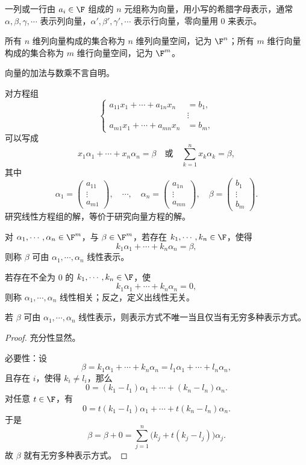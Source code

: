\begin{definition}
	一列或一行由 $a_i\in\F$ 组成的 $n$ 元组称为向量，用小写的希腊字母表示，通常 $\alpha,\beta,\gamma,\cdots$ 表示列向量，$\alpha',\beta',\gamma',\cdots$ 表示行向量，零向量用 $0$ 来表示。
	
	所有 $n$ 维列向量构成的集合称为 $n$ 维列向量空间，记为 $\F^n$；所有 $m$ 维行向量构成的集合称为 $m$ 维行向量空间，记为 $\F^m$。
	
	向量的加法与数乘不言自明。
	
	
\end{definition}
对方程组
\[
\left\{
\begin{aligned}
	a_{11}x_1+\cdots+a_{1n}x_n&=b_1,\\
	&\vdots\\
	a_{m1}x_1+\cdots+a_{mn}x_n&=b_m,
\end{aligned}
\right.
\]
可以写成
\[
x_1\alpha_1+\cdots+x_n\alpha_n=\beta
\quad\text{或}\quad
\sum_{k=1}^n x_k\alpha_k=\beta,
\]
其中
\[
\alpha_1=
\begin{pmatrix}
	a_{11}\\
	\vdots\\
	a_{m1}
\end{pmatrix},\quad
\cdots,\quad
\alpha_n=
\begin{pmatrix}
	a_{1n}\\
	\vdots\\
	a_{mn}
\end{pmatrix},\quad
\beta=
\begin{pmatrix}
	b_1\\
	\vdots\\
	b_m
\end{pmatrix}.
\]
研究线性方程组的解，等价于研究向量方程的解。
\begin{definition}
	对 $\alpha_1,\cdots,\alpha_n\in\F^m$，与 $\beta\in\F^m$，若存在 $k_1,\cdots,k_n\in\F$，使得
	\[
	k_1\alpha_1+\cdots+k_n\alpha_n=\beta,
	\]
	则称 $\beta$ 可由 $\alpha_1,\cdots,\alpha_n$ 线性表示。
	
	若存在不全为 $0$ 的 $k_1,\cdots,k_n\in\F$，使
	\[
	k_1\alpha_1+\cdots+k_n\alpha_n=0,
	\]
	则称 $\alpha_1,\cdots,\alpha_n$ 线性相关；反之，定义出线性无关。
\end{definition}

\begin{proposition}
	若 $\beta$ 可由 $\alpha_1,\cdots,\alpha_n$ 线性表示，则表示方式不唯一当且仅当有无穷多种表示方式。
\end{proposition}
\begin{proof}
	充分性显然。
	
	必要性：设
	\[
	\beta=k_1\alpha_1+\cdots+k_n\alpha_n
	=l_1\alpha_1+\cdots+l_n\alpha_n,
	\]
	且存在 $i$，使得 $k_i\neq l_i$，那么
	\[
	0=(k_1-l_1)\alpha_1+\cdots+(k_n-l_n)\alpha_n.
	\]
	对任意 $t\in\F$，有
	\[
	0=t(k_1-l_1)\alpha_1+\cdots+t(k_n-l_n)\alpha_n.
	\]
	于是
	\[
	\beta=\beta+0=
	\sum_{j=1}^n\bigl(k_j+t(k_j-l_j)\bigr)\alpha_j.
	\]
	故 $\beta$ 就有无穷多种表示方式。
\end{proof}

